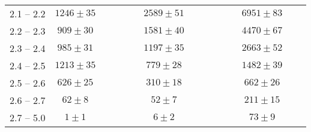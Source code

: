 {{\begin{tabular}{|c|c|c|c|c|c|c|c|c|c|c|c|c|c|c|}
            \cline{1-2}\cline{7-7}\cline{13-13}
            2.1 -- 2.2               & $1246\pm35$&                                      &                                        &                                   &                                  & $2589\pm51$&                 &                  &                   &                  &                    & $6951\pm83$&                   & \\   
            \cline{1-2}\cline{7-7}\cline{13-13}
            2.2 -- 2.3               & $909\pm30$&                                      &                                        &                                   &                                  & $1581\pm40$&                &                  &                   &                  &                    &  $4470\pm67$&                  & \\   
            \cline{1-2}\cline{7-7}\cline{13-13}
            2.3 -- 2.4               & $985\pm31$&                                      &                                        &                                   &                                  & $1197\pm35$&                &                  &                   &                  &                    & $2663\pm52$&                   & \\   
            \cline{1-2}\cline{7-7}\cline{13-13}
            2.4 -- 2.5               & $1213\pm35$&                                     &                                        &                                   &                                  &$779\pm28$  &                &                  &                   &                  &                    & $1482\pm39$ &                  & \\   
            \cline{1-2}\cline{7-7}\cline{13-13}
            2.5 -- 2.6               & $626\pm25$&                                     &                                        &                                   &                                  &$310\pm18$ &                 &                  &                   &                  &                    &  $662\pm26$&                  & \\   
            \cline{1-2}\cline{7-7}\cline{13-13}
            2.6 -- 2.7               & $62\pm8$&                                     &                                        &                                   &                                  & $52\pm7$ &                &                  &                   &                  &                    & $211\pm15$ &                   & \\   
            \cline{1-2}\cline{7-7}\cline{13-13}
            2.7 -- 5.0               & $1\pm1$&                                     &                                        &                                   &                                  & $6\pm2$&                &                  &                   &                  &                    & $73\pm9$&                  & \\   
            \hline
        \end{tabular}
    }
}
